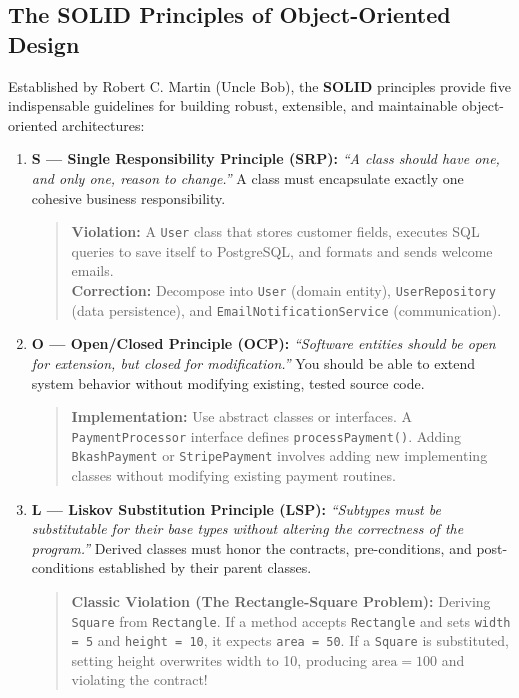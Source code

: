 \subsection{The SOLID Principles of Object-Oriented Design}
Established by Robert C. Martin (Uncle Bob), the \textbf{SOLID} principles provide five indispensable guidelines for building robust, extensible, and maintainable object-oriented architectures:
\begin{enumerate}
    \item \textbf{S --- Single Responsibility Principle (SRP):}
    \textit{``A class should have one, and only one, reason to change.''} A class must encapsulate exactly one cohesive business responsibility.
    \begin{quote}
    \textbf{Violation:} A \texttt{User} class that stores customer fields, executes SQL queries to save itself to PostgreSQL, and formats and sends welcome emails. \\
    \textbf{Correction:} Decompose into \texttt{User} (domain entity), \texttt{UserRepository} (data persistence), and \texttt{EmailNotificationService} (communication).
    \end{quote}
    \item \textbf{O --- Open/Closed Principle (OCP):}
    \textit{``Software entities should be open for extension, but closed for modification.''} You should be able to extend system behavior without modifying existing, tested source code.
    \begin{quote}
    \textbf{Implementation:} Use abstract classes or interfaces. A \texttt{PaymentProcessor} interface defines \texttt{processPayment()}. Adding \texttt{BkashPayment} or \texttt{StripePayment} involves adding new implementing classes without modifying existing payment routines.
    \end{quote}
    \item \textbf{L --- Liskov Substitution Principle (LSP):}
    \textit{``Subtypes must be substitutable for their base types without altering the correctness of the program.''} Derived classes must honor the contracts, pre-conditions, and post-conditions established by their parent classes.
    \begin{quote}
    \textbf{Classic Violation (The Rectangle-Square Problem):} Deriving \texttt{Square} from \texttt{Rectangle}. If a method accepts \texttt{Rectangle} and sets \texttt{width = 5} and \texttt{height = 10}, it expects \texttt{area = 50}. If a \texttt{Square} is substituted, setting height overwrites width to 10, producing $\text{area} = 100$ and violating the contract!

\end{quote}
\end{enumerate}
